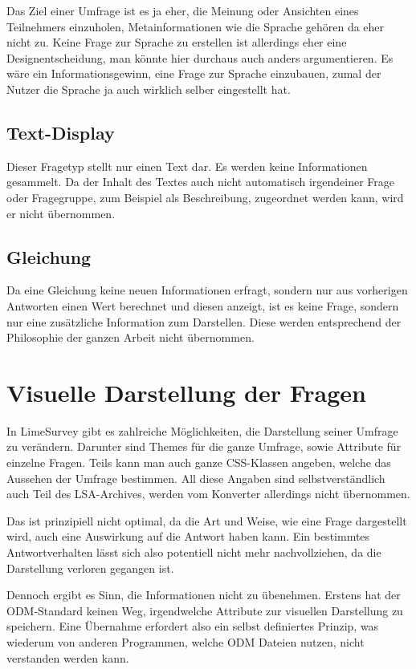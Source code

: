 Das Ziel einer Umfrage ist es ja eher, die Meinung oder Ansichten eines Teilnehmers einzuholen, Metainformationen wie die Sprache gehören da eher nicht zu.
Keine Frage zur Sprache zu erstellen ist allerdings eher eine Designentscheidung, man könnte hier durchaus auch anders argumentieren.
Es wäre ein Informationsgewinn, eine Frage zur Sprache einzubauen, zumal der Nutzer die Sprache ja auch wirklich selber eingestellt hat.

\subsection{Text-Display}

Dieser Fragetyp stellt nur einen Text dar. Es werden keine Informationen gesammelt.
Da der Inhalt des Textes auch nicht automatisch irgendeiner Frage oder Fragegruppe, zum Beispiel als Beschreibung, zugeordnet werden kann, wird er nicht übernommen.

\subsection{Gleichung}

Da eine Gleichung keine neuen Informationen erfragt, sondern nur aus vorherigen Antworten einen Wert berechnet und diesen anzeigt, ist es keine Frage, sondern nur eine zusätzliche Information zum Darstellen.
Diese werden entsprechend der Philosophie der ganzen Arbeit nicht übernommen.


\section{Visuelle Darstellung der Fragen}
\label{d:themes}

In LimeSurvey gibt es zahlreiche Möglichkeiten, die Darstellung seiner Umfrage zu verändern.
Darunter sind Themes für die ganze Umfrage, sowie Attribute für einzelne Fragen.
Teils kann man auch ganze CSS-Klassen angeben, welche das Aussehen der Umfrage bestimmen.
All diese Angaben sind selbstverständlich auch Teil des LSA-Archives, werden vom Konverter allerdings nicht übernommen.

Das ist prinzipiell nicht optimal, da die Art und Weise, wie eine Frage dargestellt wird, auch eine Auswirkung auf die Antwort haben kann\cite{quest_eff}.
Ein bestimmtes Antwortverhalten lässt sich also potentiell nicht mehr nachvollziehen, da die Darstellung verloren gegangen ist.

Dennoch ergibt es Sinn, die Informationen nicht zu übenehmen.
Erstens hat der ODM-Standard keinen Weg, irgendwelche Attribute zur visuellen Darstellung zu speichern.
Eine Übernahme erfordert also ein selbst definiertes Prinzip, was wiederum von anderen Programmen, welche ODM Dateien nutzen, nicht verstanden werden kann.

